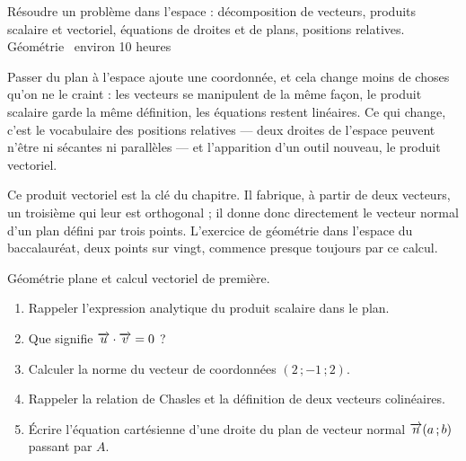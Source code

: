   {Résoudre un problème dans l'espace : décomposition de vecteurs, produits
   scalaire et vectoriel, équations de droites et de plans, positions
   relatives.}
  {Géométrie \textbullet\ environ 10 heures}

Passer du plan à l'espace ajoute une coordonnée, et cela change moins de
choses qu'on ne le craint : les vecteurs se manipulent de la même façon, le
produit scalaire garde la même définition, les équations restent linéaires. Ce
qui change, c'est le vocabulaire des positions relatives — deux droites de
l'espace peuvent n'être ni sécantes ni parallèles — et l'apparition d'un outil
nouveau, le produit vectoriel.

Ce produit vectoriel est la clé du chapitre. Il fabrique, à partir de deux
vecteurs, un troisième qui leur est orthogonal ; il donne donc directement le
vecteur normal d'un plan défini par trois points. L'exercice de géométrie dans
l'espace du baccalauréat, deux points sur vingt, commence presque toujours par
ce calcul.

\begin{revision}
Géométrie plane et calcul vectoriel de première.

\begin{enumerate}[label=\textbf{\arabic*.}, leftmargin=*, itemsep=0.35em]
  \item Rappeler l'expression analytique du produit scalaire dans le plan.
  \item Que signifie $\overrightarrow{u} \cdot \overrightarrow{v} = 0$ ?
  \item Calculer la norme du vecteur de coordonnées $(2\,;-1\,;2)$.
  \item Rappeler la relation de Chasles et la définition de deux vecteurs
        colinéaires.
  \item Écrire l'équation cartésienne d'une droite du plan de vecteur normal
        $\overrightarrow{n}(a\,;b)$ passant par $A$.
\end{enumerate}
\end{revision}

